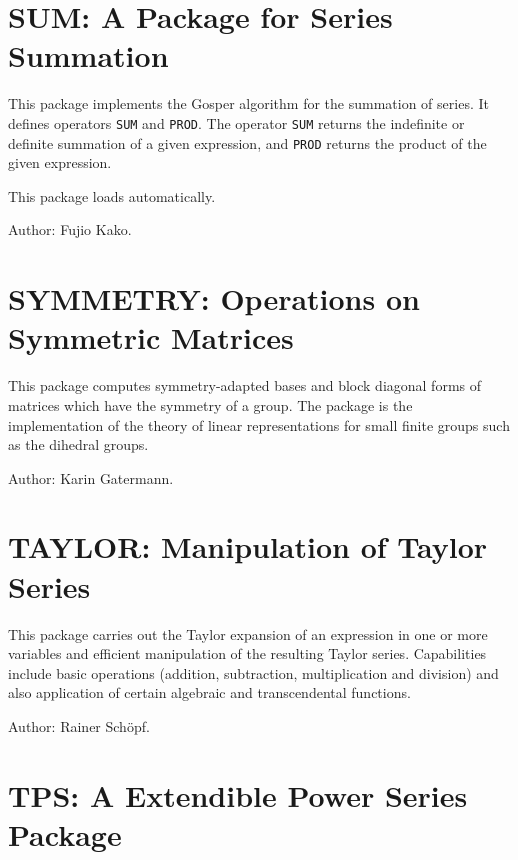 \newpage

\section{SUM: A Package for Series Summation}

This package implements the Gosper algorithm for the summation of series.
It defines operators {\tt SUM} and {\tt PROD}.  The operator {\tt SUM}
returns the indefinite or definite summation of a given expression, and
{\tt PROD} returns the product of the given expression.

This package loads automatically.

Author: Fujio Kako.



\newpage

\section{SYMMETRY: Operations on Symmetric Matrices}

This package computes symmetry-adapted bases and block diagonal forms of
matrices which have the symmetry of a group.  The package is the
implementation of the theory of linear representations for small finite
groups such as the dihedral groups.

Author: Karin Gatermann.



\newpage

\iffalse
\section{TAYLOR: Manipulation of Taylor Series}

 

This package carries out the Taylor expansion of an expression in one or
more variables and efficient manipulation of the resulting Taylor series.
Capabilities include basic operations (addition, subtraction,
multiplication and division) and also application of certain algebraic and
transcendental functions.

Author: Rainer Sch\"opf.



\newpage

\section{TPS: A Extendible Power Series Package}

